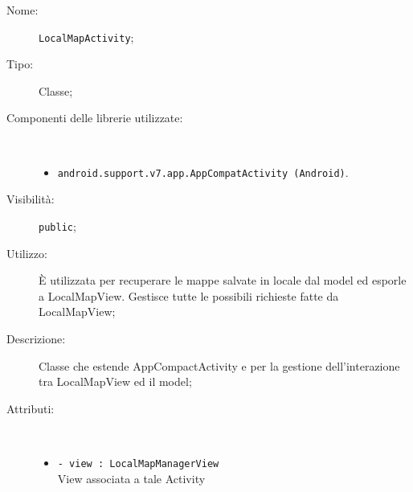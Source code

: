 \documentclass[../DefinizioneDiProdotto.tex]{subfiles}
\begin{document}
\begin{description}
	\item[Nome:] \texttt{LocalMapActivity};
	\item[Tipo:] Classe;
	\item[Componenti delle librerie utilizzate:] \
	\begin{itemize}
		\item \texttt{android.support.v7.app.AppCompatActivity (Android)}.
		
	\end{itemize}
	\item[Visibilità:] \texttt{public};
	\item[Utilizzo:] È utilizzata per recuperare le mappe salvate in locale dal model ed esporle a LocalMapView. Gestisce tutte le possibili richieste fatte da LocalMapView;
	\item[Descrizione:] Classe che estende AppCompactActivity e per la gestione dell'interazione tra LocalMapView ed il model;
	\item[Attributi:] \
	\begin{itemize}
		\item \texttt{- view : LocalMapManagerView}\\
		View associata a tale Activity
		

\end{itemize}
\end{description}
\end{document}
